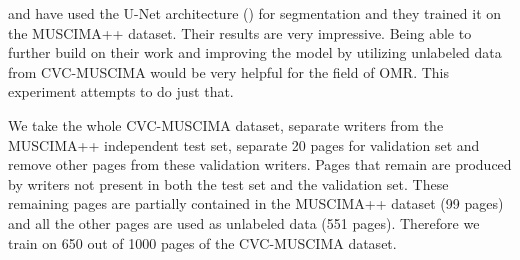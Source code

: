 \cite{DorferEtAl} and \cite{HajicEtAl} have used the U-Net architecture (\cite{UNet}) for segmentation and they trained it on the MUSCIMA++ dataset. Their results are very impressive. Being able to further build on their work and improving the model by utilizing unlabeled data from CVC-MUSCIMA would be very helpful for the field of OMR. This experiment attempts to do just that.

We take the whole CVC-MUSCIMA dataset, separate writers from the MUSCIMA++ independent test set, separate 20 pages for validation set and remove other pages from these validation writers. Pages that remain are produced by writers not present in both the test set and the validation set. These remaining pages are partially contained in the MUSCIMA++ dataset (99 pages) and all the other pages are used as unlabeled data (551 pages). Therefore we train on 650 out of 1000 pages of the CVC-MUSCIMA dataset.

